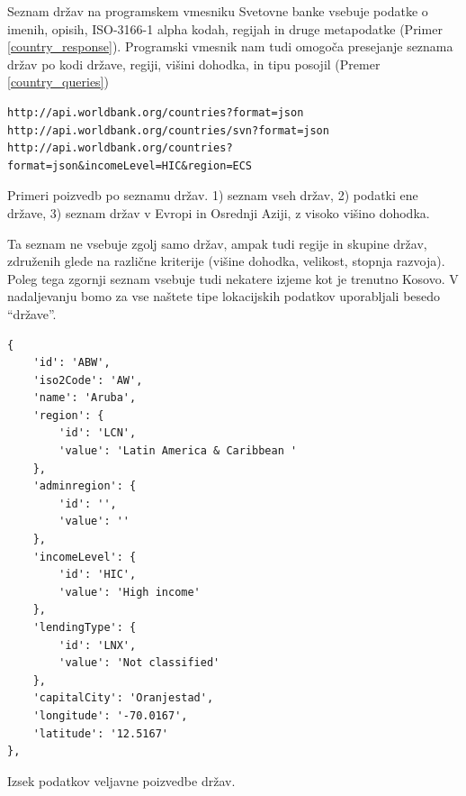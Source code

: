 Seznam držav na programskem vmesniku Svetovne banke vsebuje podatke o imenih, 
opisih, ISO-3166-1 alpha kodah, regijah in druge metapodatke 
(Primer \ref{country_response}). Programski
vmesnik nam tudi omogoča presejanje seznama držav po kodi države, regiji,
višini dohodka, in tipu posojil (Premer \ref{country_queries})


\begin{snippet}
\begin{center}
\begin{lstlisting}
http://api.worldbank.org/countries?format=json
http://api.worldbank.org/countries/svn?format=json
http://api.worldbank.org/countries?format=json&incomeLevel=HIC&region=ECS
\end{lstlisting}
\end{center}
\caption{Primeri poizvedb po seznamu držav.
1) seznam vseh držav, 2) podatki ene države,
3) seznam držav v Evropi in Osrednji Aziji, z visoko višino dohodka.}
\label{country_queries}
\end{snippet} 

Ta seznam ne vsebuje zgolj samo držav, ampak tudi regije in skupine držav, 
združenih glede na različne kriterije (višine dohodka, velikost, stopnja
razvoja). Poleg tega zgornji seznam vsebuje tudi nekatere izjeme kot je trenutno
Kosovo. V nadaljevanju bomo za vse naštete tipe lokacijskih podatkov
uporabljali besedo ``države''. 

\begin{snippet}
\begin{center}
\begin{lstlisting}
{
    'id': 'ABW',
    'iso2Code': 'AW',
    'name': 'Aruba',
    'region': {
        'id': 'LCN',
        'value': 'Latin America & Caribbean '
    },
    'adminregion': {
        'id': '',
        'value': ''
    },
    'incomeLevel': {
        'id': 'HIC',
        'value': 'High income'
    },
    'lendingType': {
        'id': 'LNX',
        'value': 'Not classified'
    },
    'capitalCity': 'Oranjestad',
    'longitude': '-70.0167',
    'latitude': '12.5167'
},
\end{lstlisting}
\end{center}
\caption[some]{Izsek podatkov veljavne poizvedbe držav.}
\label{country_response}
\end{snippet} 



